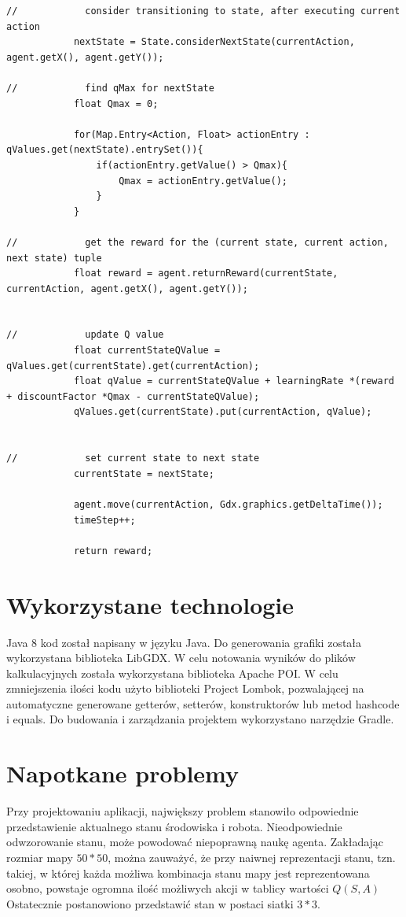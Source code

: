 \begin{lstlisting}[caption=Implementacja algorytmu Q-learning, label={lst:qlearning}, captionpos=b, 
belowcaptionskip=4pt]
//            consider transitioning to state, after executing current action
            nextState = State.considerNextState(currentAction, agent.getX(), agent.getY());

//            find qMax for nextState
            float Qmax = 0;

            for(Map.Entry<Action, Float> actionEntry : qValues.get(nextState).entrySet()){
                if(actionEntry.getValue() > Qmax){
                    Qmax = actionEntry.getValue();
                }
            }

//            get the reward for the (current state, current action, next state) tuple
            float reward = agent.returnReward(currentState, currentAction, agent.getX(), agent.getY());


//            update Q value
            float currentStateQValue = qValues.get(currentState).get(currentAction);
            float qValue = currentStateQValue + learningRate *(reward + discountFactor *Qmax - currentStateQValue);
            qValues.get(currentState).put(currentAction, qValue);


//            set current state to next state
            currentState = nextState;

            agent.move(currentAction, Gdx.graphics.getDeltaTime());
            timeStep++;

            return reward;
\end{lstlisting}

\section{Wykorzystane technologie}
\label{sec:wykorzystanetechnologie}

Java 8 kod został napisany w języku Java. Do generowania grafiki została wykorzystana biblioteka LibGDX. W celu notowania wyników do plików kalkulacyjnych została wykorzystana biblioteka Apache POI.
W celu zmniejszenia ilości kodu użyto biblioteki Project Lombok, pozwalającej na automatyczne generowane getterów, 
setterów, konstruktorów lub metod hashcode i equals. Do budowania i zarządzania projektem wykorzystano narzędzie Gradle.

\section{Napotkane problemy}
\label{sec:napotkaneproblemy}

Przy projektowaniu aplikacji, największy problem stanowiło odpowiednie przedstawienie aktualnego stanu środowiska i robota. Nieodpowiednie odwzorowanie stanu, może powodować niepoprawną naukę agenta.
Zakładając rozmiar mapy $50*50$, można zauważyć, że przy naiwnej reprezentacji stanu, tzn. takiej, w której każda możliwa kombinacja stanu mapy jest reprezentowana osobno, powstaje ogromna ilość możliwych akcji w tablicy wartości $Q(S,A)$ 
Ostatecznie postanowiono przedstawić stan w postaci siatki $3*3$.

